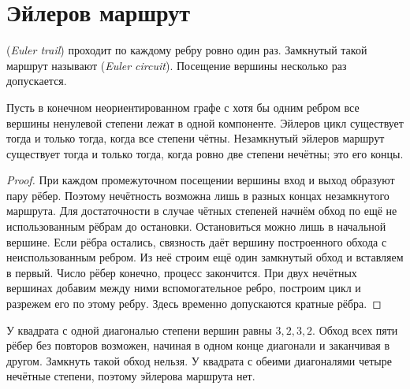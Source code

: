 \section{Эйлеров маршрут}
\begin{definition} (\emph{Euler trail}) проходит по каждому ребру ровно один раз. Замкнутый такой маршрут называют  (\emph{Euler circuit}). Посещение вершины несколько раз допускается.\end{definition}
\begin{theorem}
Пусть в конечном неориентированном графе с хотя бы одним ребром все вершины ненулевой степени лежат в одной компоненте. Эйлеров цикл существует тогда и только тогда, когда все степени чётны. Незамкнутый эйлеров маршрут существует тогда и только тогда, когда ровно две степени нечётны; это его концы.
\end{theorem}
\begin{proof}При каждом промежуточном посещении вершины вход и выход образуют пару рёбер. Поэтому нечётность возможна лишь в разных концах незамкнутого маршрута. Для достаточности в случае чётных степеней начнём обход по ещё не использованным рёбрам до остановки. Остановиться можно лишь в начальной вершине. Если рёбра остались, связность даёт вершину построенного обхода с неиспользованным ребром. Из неё строим ещё один замкнутый обход и вставляем в первый. Число рёбер конечно, процесс закончится. При двух нечётных вершинах добавим между ними вспомогательное ребро, построим цикл и разрежем его по этому ребру. Здесь временно допускаются кратные рёбра.\end{proof}
\begin{example}У квадрата с одной диагональю степени вершин равны \(3,2,3,2\). Обход всех пяти рёбер без повторов возможен, начиная в одном конце диагонали и заканчивая в другом. Замкнуть такой обход нельзя. У квадрата с обеими диагоналями четыре нечётные степени, поэтому эйлерова маршрута нет.\end{example}
